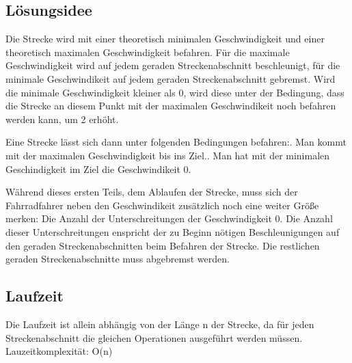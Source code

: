 \subsection {Lösungsidee}
	Die Strecke wird mit einer theoretisch minimalen Geschwindigkeit und einer theoretisch maximalen Geschwindigkeit befahren. 
	Für die maximale Geschwindigkeit wird auf jedem geraden Streckenabschnitt beschleunigt, für die minimale Geschwindikeit auf
	jedem geraden Streckenabschnitt gebremst. Wird die minimale Geschwindigkeit kleiner als 0, wird diese unter der Bedingung, 
	dass die Strecke an diesem Punkt mit der maximalen Geschwindikeit noch befahren werden kann, um 2 erhöht.
	
	Eine Strecke lässt sich dann unter folgenden Bedingungen befahren:. Man kommt mit der maximalen Geschwindigkeit bis ins Ziel.. Man hat mit der minimalen Geschindigkeit im Ziel die Geschwindikeit 0.

	Während dieses ersten Teils, dem Ablaufen der Strecke, muss sich der Fahrradfahrer neben den Geschwindikeit zusätzlich noch
	eine weiter Größe merken: Die Anzahl der Unterschreitungen der Geschwindigkeit 0. Die Anzahl dieser Unterschreitungen enspricht
	der zu Beginn nötigen Beschleunigungen auf den geraden Streckenabschnitten beim Befahren der Strecke. Die restlichen geraden Streckenabschnitte muss abgebremst werden.
\subsection{Laufzeit}
	Die Laufzeit ist allein abhängig von der Länge n der Strecke, da für jeden Streckenabschnitt die gleichen Operationen ausgeführt werden müssen. Lauzeitkomplexität: O(n)
